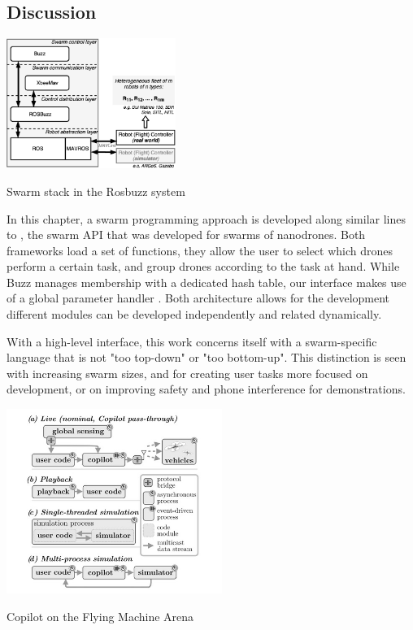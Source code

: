 \pagebreak
\subsection{Discussion}


\begin{marginfigure}%
    \vspace{1cm}
    \includegraphics[width=5.5cm]{images/testbed/discussion/rosbuzz_comparison.png}
    \caption{Swarm stack in the Rosbuzz system \cite{buzz_swarm_stack}}
    \label{diagram:swarm_stack}
\end{marginfigure}


In this chapter, a swarm programming approach is developed along similar lines to \cite{pinciroli_lee-brown_beltrame_2015}, the swarm API that was developed for swarms of nanodrones. Both frameworks load a set of functions, they allow the user to select which drones perform a certain task, and group drones according to the task at hand. While Buzz manages membership with a dedicated hash table, our interface makes use of a global parameter handler \cite{buzz_swarm_stack}. Both architecture allows for the development different modules can be developed independently and related dynamically. 

With a high-level interface, this work concerns itself with a swarm-specific language that is not "too top-down" or "too bottom-up". This distinction is seen with increasing swarm sizes, and for creating user tasks more focused on development, or on improving safety and phone interference for demonstrations. 

\begin{marginfigure}%
    \vspace{1cm}
    \hspace{-0.7cm} \includegraphics[width=7cm]{images/testbed/discussion/copilot_structure_bw.jpg}
    \caption{Copilot on the Flying Machine Arena \cite{fma_paper}}
    \label{diagram:copilot}
\end{marginfigure}

